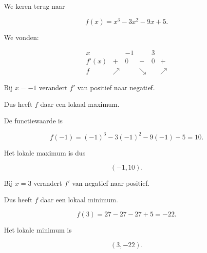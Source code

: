 \documentclass{ximera}
\begin{document}
\begin{voorbeeld}

We keren terug naar

\[
f(x)=x^3-3x^2-9x+5.
\]

We vonden:

\[
\begin{array}{c|ccccc}
x
& 
& -1
&
& 3
& 
\\ \hline
f'(x)
& +
& 0
& -
& 0
& +
\\ \hline
f
& \nearrow
&
& \searrow
&
& \nearrow
\end{array}
\]

Bij $x=-1$ verandert $f'$ van positief naar negatief.

Dus heeft $f$ daar een lokaal maximum.

De functiewaarde is

\[
f(-1)
=
(-1)^3-3(-1)^2-9(-1)+5
=
10.
\]

Het lokale maximum is dus

\[
\boxed{(-1,10)}.
\]

Bij $x=3$ verandert $f'$ van negatief naar positief.

Dus heeft $f$ daar een lokaal minimum.

\[
f(3)
=
27-27-27+5
=
-22.
\]

Het lokale minimum is

\[
\boxed{(3,-22)}.
\]

\end{voorbeeld}


\end{document}
